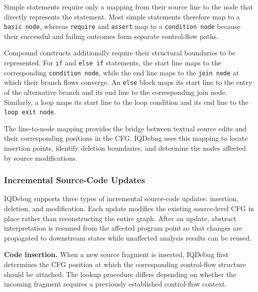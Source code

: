 \documentclass[11pt,oneside]{report}
\theoremstyle{plain}
\theoremstyle{definition}
\theoremstyle{remark}
\begin{document}
Simple statements require only a mapping from their source line to the node that directly represents the statement.
Most simple statements therefore map to a \texttt{basic node}, whereas \texttt{require} and \texttt{assert} map to a \texttt{condition node} because their successful and failing outcomes form separate control-flow paths.

Compound constructs additionally require their structural boundaries to be represented.
For \texttt{if} and \texttt{else if} statements, the start line maps to the corresponding \texttt{condition node}, while the end line maps to the \texttt{join node} at which their branch flows converge.
An \texttt{else} block maps its start line to the entry of the alternative branch and its end line to the corresponding join node.
Similarly, a loop maps its start line to the loop condition and its end line to the \texttt{loop exit node}.

The line-to-node mapping provides the bridge between textual source edits and their corresponding positions in the CFG. IQDebug uses this mapping to locate insertion points, identify deletion boundaries, and determine the nodes affected by source modifications.

\subsubsection{Incremental Source-Code Updates}
\label{subsubsec:design:representation:updates}
IQDebug supports three types of incremental source-code updates: insertion, deletion, and modification.
Each update modifies the existing source-level CFG in place rather than reconstructing the entire graph.
After an update, abstract interpretation is resumed from the affected program point so that changes are propagated to downstream states while unaffected analysis results can be reused.

\smallskip
\noindent\textbf{Code insertion.}
When a new source fragment is inserted, IQDebug first determines the CFG position at which the corresponding control-flow structure should be attached.
The lookup procedure differs depending on whether the incoming fragment requires a previously established control-flow context.
\end{document}
